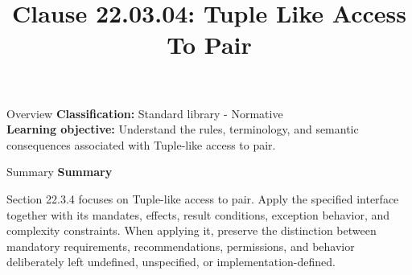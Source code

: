 \documentclass[10pt,letterpaper]{article}
\title{Clause 22.03.04: Tuple Like Access To Pair}
\author{}
\date{}
\begin{document}
\maketitle
\begin{CornellOverviewBox}{Overview}
\textbf{Classification:} Standard library - Normative\\[2pt]
\textbf{Learning objective:} Understand the rules, terminology, and semantic consequences associated with Tuple-like access to pair.
\end{CornellOverviewBox}\begin{CornellSummaryBox}{Summary}
{\sffamily\bfseries\color{Accent} Summary}\par\vspace{3pt}Section 22.3.4 focuses on Tuple-like access to pair. Apply the specified interface together with its mandates, effects, result conditions, exception behavior, and complexity constraints. When applying it, preserve the distinction between mandatory requirements, recommendations, permissions, and behavior deliberately left undefined, unspecified, or implementation-defined.
\end{CornellSummaryBox}
\end{document}
